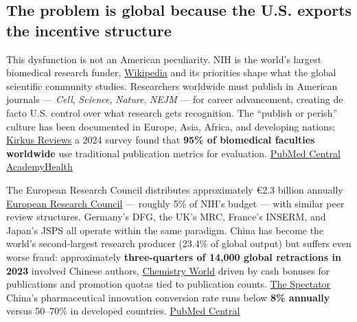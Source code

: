 \subsection{The problem is global because the U.S. exports the incentive structure}\label{19_200_billion-the-problem-is-global-because-the-u.s.-exports-the-incentive-structure}

This dysfunction is not an American peculiarity. NIH is the world's largest biomedical research funder, \href{https://en.wikipedia.org/wiki/Biomedical_research_in_the_United_States}{Wikipedia} and its priorities shape what the global scientific community studies. Researchers worldwide must publish in American journals --- \emph{Cell}, \emph{Science}, \emph{Nature}, \emph{NEJM} --- for career advancement, creating de facto U.S. control over what research gets recognition. The ``publish or perish'' culture has been documented in Europe, Asia, Africa, and developing nations; \href{https://www.kirkusreviews.com/book-reviews/richard-harris/rigor-mortis-sloppy-science/}{Kirkus Reviews} a 2024 survey found that \textbf{95\% of biomedical faculties worldwide} use traditional publication metrics for evaluation. \href{https://pmc.ncbi.nlm.nih.gov/articles/PMC7315647/}{PubMed Central} \href{https://academyhealth.org/sites/default/files/publication/\%5Bfield_date:custom:Y\%5D-\%5Bfield_date:custom:m\%5D/academicincentivesresearchimpact_feb2021.pdf}{AcademyHealth}

The European Research Council distributes approximately €2.3 billion annually \href{https://erc.europa.eu/about-erc/erc-glance}{European Research Council} --- roughly 5\% of NIH's budget --- with similar peer review structures. Germany's DFG, the UK's MRC, France's INSERM, and Japan's JSPS all operate within the same paradigm. China has become the world's second-largest research producer (23.4\% of global output) but suffers even worse fraud: approximately \textbf{three-quarters of 14,000 global retractions in 2023} involved Chinese authors, \href{https://www.chemistryworld.com/news/china-conducts-nationwide-audit-of-research-misconduct-after-thousands-of-papers-retracted/4018981.article}{Chemistry World} driven by cash bonuses for publications and promotion quotas tied to publication counts. \href{https://www.spectator.co.uk/article/the-paper-mills-helping-china-commit-scientific-fraud/}{The Spectator} China's pharmaceutical innovation conversion rate runs below \textbf{8\% annually} versus 50--70\% in developed countries. \href{https://pmc.ncbi.nlm.nih.gov/articles/PMC11974572/}{PubMed Central}


